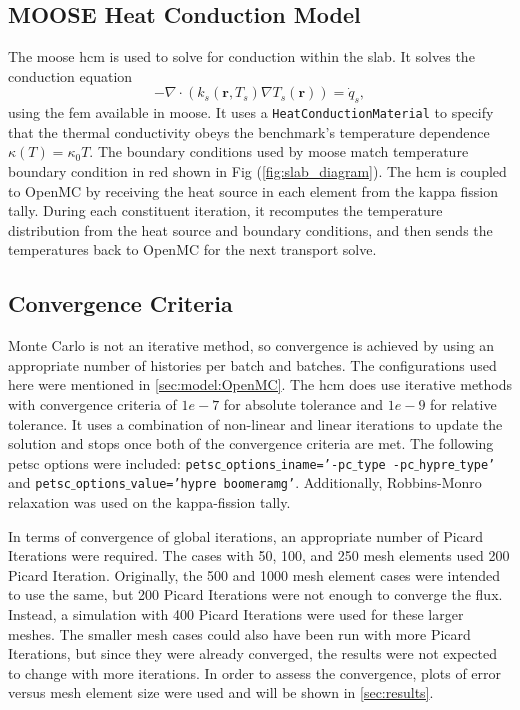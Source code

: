 \documentclass[letterpaper]{mc2023}
\begin{document}
\subsection{MOOSE Heat Conduction Model}
The \gls{moose} \gls{hcm} is used to solve for conduction within the slab. It solves the conduction equation
\begin{equation}\label{eq:conduction}
    - \nabla \cdot (k_{s}(\mathbf{r},T_{s}) \nabla T_{s}(\mathbf{r})) = \dot{q}_{s},
\end{equation}
using the \gls{fem} available in \gls{moose}. It uses a \texttt{HeatConductionMaterial} to specify that the thermal conductivity
obeys the benchmark's temperature dependence $\kappa(T)=\kappa_{0}T$. The boundary conditions used by \gls{moose} match temperature
boundary condition in red shown in Fig (\ref{fig:slab_diagram}). The \gls{hcm} is coupled to OpenMC by receiving the heat source in
each element from the kappa fission tally. During each constituent iteration, it recomputes the temperature distribution from the heat
source and boundary conditions, and then sends the temperatures back to OpenMC for the next transport solve.

\subsection{Convergence Criteria}
Monte Carlo is not an iterative method, so convergence is achieved by using an appropriate number of histories per batch and batches. The
configurations used here were mentioned in \ref{sec:model:OpenMC}. The \gls{hcm} does use iterative methods with convergence criteria of
 $1e-7$ for absolute tolerance and $1e-9$ for relative tolerance. It uses a combination of non-linear and linear iterations to update the
 solution and stops once both of the convergence criteria are met. The following petsc options were included:
 \texttt{petsc$\_$options$\_$iname='-pc$\_$type -pc$\_$hypre$\_$type'} and \texttt{petsc$\_$options$\_$value='hypre boomeramg'}. Additionally, Robbins-Monro
relaxation was used on the kappa-fission tally.

In terms of convergence of global iterations, an appropriate number of Picard Iterations were required. The cases with 50, 100, and 250
mesh elements used 200 Picard Iteration. Originally, the 500 and 1000 mesh element cases were intended to use the same, but 200 Picard
Iterations were not enough to converge the flux. Instead, a simulation with 400 Picard Iterations were used for these larger meshes. The
smaller mesh cases could also have been run with more Picard Iterations, but since they were already converged, the results were not expected
to change with more iterations. In order to assess the convergence, plots of error versus mesh element size were used and will be shown
in \ref{sec:results}.
\end{document}
